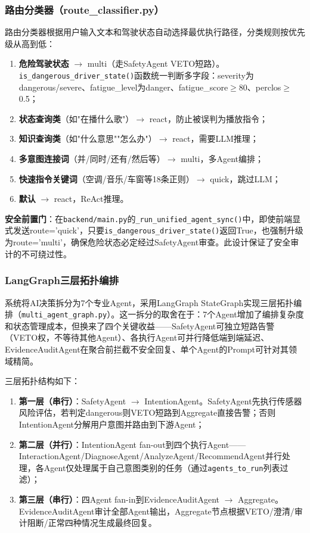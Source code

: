 \documentclass[a4paper]{article}
\begin{document}
\subsubsection{路由分类器（route\_classifier.py）}

路由分类器根据用户输入文本和驾驶状态自动选择最优执行路径，分类规则按优先级从高到低：

\begin{enumerate}
    \item \textbf{危险驾驶状态} $\rightarrow$ multi（走SafetyAgent VETO短路）。\texttt{is\_dangerous\_driver\_state()}函数统一判断多字段：severity为dangerous/severe、fatigue\_level为danger、fatigue\_score$\geq$80、perclos$\geq$0.5；
    \item \textbf{状态查询类}（如"在播什么歌"）$\rightarrow$ react，防止被误判为播放指令；
    \item \textbf{知识查询类}（如"什么意思""怎么办"）$\rightarrow$ react，需要LLM推理；
    \item \textbf{多意图连接词}（并/同时/还有/然后等）$\rightarrow$ multi，多Agent编排；
    \item \textbf{快速指令关键词}（空调/音乐/车窗等18条正则）$\rightarrow$ quick，跳过LLM；
    \item \textbf{默认} $\rightarrow$ react，ReAct推理。
\end{enumerate}

\textbf{安全前置门}：在\texttt{backend/main.py}的\texttt{\_run\_unified\_agent\_sync()}中，即使前端显式发送route='quick'，只要\texttt{is\_dangerous\_driver\_state()}返回True，也强制升级为route='multi'，确保危险状态必定经过SafetyAgent审查。此设计保证了安全审计的不可绕过性。

\subsubsection{LangGraph三层拓扑编排}

系统将AI决策拆分为7个专业Agent，采用LangGraph StateGraph实现三层拓扑编排（\texttt{multi\_agent\_graph.py}）。这一拆分的取舍在于：7个Agent增加了编排复杂度和状态管理成本，但换来了四个关键收益——SafetyAgent可独立短路告警（VETO权，不等待其他Agent）、各执行Agent可并行降低端到端延迟、EvidenceAuditAgent在聚合前拦截不安全回复、单个Agent的Prompt可针对其领域精简。

三层拓扑结构如下：

\begin{enumerate}
    \item \textbf{第一层（串行）}：SafetyAgent $\rightarrow$ IntentionAgent。SafetyAgent先执行传感器风险评估，若判定dangerous则VETO短路到Aggregate直接告警；否则IntentionAgent分解用户意图并路由到下游Agent；
    \item \textbf{第二层（并行）}：IntentionAgent fan-out到四个执行Agent——InteractionAgent/DiagnoseAgent/AnalyzeAgent/RecommendAgent并行处理，各Agent仅处理属于自己意图类别的任务（通过\texttt{agents\_to\_run}列表过滤）；
    \item \textbf{第三层（串行）}：四Agent fan-in到EvidenceAuditAgent $\rightarrow$ Aggregate。EvidenceAuditAgent审计全部Agent输出，Aggregate节点根据VETO/澄清/审计阻断/正常四种情况生成最终回复。
\end{enumerate}
\end{document}
